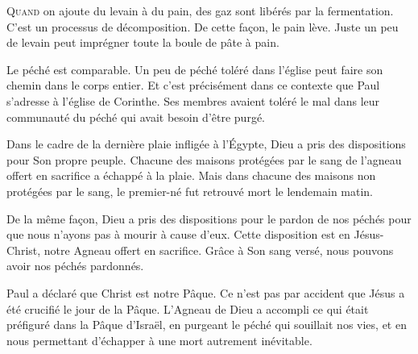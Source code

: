 \dvrule








\lettrine{Q}{uand} on ajoute du levain à du pain,
 des gaz sont libérés par la fermentation.
 C'est un processus de décomposition.
 De cette fa\c{c}on, le pain lève.
 Juste un peu de levain peut imprégner
 toute la boule de pâte à pain.

Le péché est comparable.
 Un peu de péché toléré dans l'église
 peut faire son chemin dans le corps entier.
 Et c'est précisément dans ce contexte que Paul
 s'adresse à l'église de Corinthe.
 Ses membres avaient toléré le mal
 dans leur communauté
 \ocadr du péché qui avait besoin d'être purgé.


Dans le cadre de la dernière plaie infligée à l'Égypte,
 Dieu a pris des dispositions pour Son propre peuple.
 Chacune des maisons protégées par le sang de l'agneau
 offert en sacrifice a échappé à la plaie.
 Mais dans chacune des maisons non protégées par le sang,
 le premier-né fut retrouvé mort le lendemain matin.

De la même fa\c{c}on, Dieu a pris des dispositions
 pour le pardon de nos péchés pour que nous n'ayons pas
 à mourir à cause d'eux.
 Cette disposition est en Jésus-Christ,
 notre Agneau offert en sacrifice.
 Grâce à Son sang versé,
 nous pouvons avoir nos péchés pardonnés.

Paul a déclaré que \Og Christ est notre Pâque. \Fg{}
 Ce n'est pas par accident que Jésus a été crucifié le jour de la Pâque.
 L'Agneau de Dieu a accompli ce qui était préfiguré
 dans la Pâque d'Israël, en purgeant le péché
 qui souillait nos vies, et en nous permettant d'échapper
 à une mort autrement inévitable.

